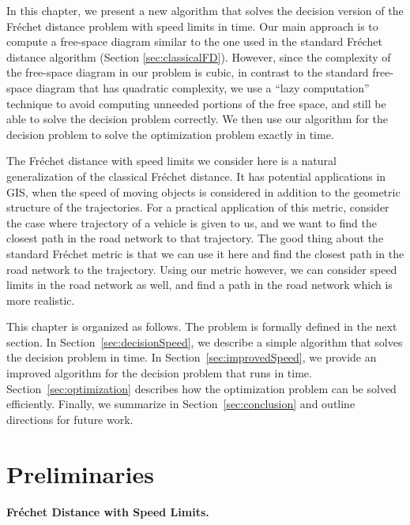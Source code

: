 \documentclass[12pt]{dalthesis}
\newcommand{\Frechet}{Fr\'echet }
\begin{document}
In this chapter, we present a new algorithm that solves the 
decision version of the \Frechet distance problem with speed limits in  time. 
Our main approach is to compute a free-space diagram 
similar to the one used in the standard \Frechet distance algorithm (Section \ref{sec:classicalFD}).
However, since the complexity of the free-space diagram  in our problem
is cubic, in contrast to the standard free-space diagram that has quadratic complexity,  
we use a ``lazy computation'' technique to
avoid computing unneeded portions of the free space, 
and still be able to solve the decision problem correctly.
We then use our algorithm for the decision problem to
solve the optimization problem exactly in  time.

The \Frechet distance with speed limits we consider here
is a natural generalization of the classical \Frechet distance.
It has potential applications in GIS, when the speed of moving objects is considered
in addition to the geometric structure of the trajectories.
For a practical application of this metric, 
consider the case where 
trajectory of a vehicle is given 
to us, and we want to find the closest path in the road network to that trajectory. The good thing about the standard \Frechet metric 
is that we can use it here and find the closest path in the road network to the trajectory. 
Using our metric however, we can consider speed limits in the road network as well, 
and find a path in the road network which is more realistic.

This chapter is organized as follows. 
The problem is formally defined in the next section.
In Section~\ref{sec:decisionSpeed}, we describe a simple algorithm that solves the decision problem in  time.
In Section~\ref{sec:improvedSpeed}, we provide an improved algorithm for the decision problem 
that runs in  time.
Section~\ref{sec:optimization} describes how the optimization problem can be solved efficiently.
Finally, we summarize in Section~\ref{sec:conclusion} and outline directions for future work.







\section{Preliminaries} \label{sec:preliminaries-Speed1}




\paragraph{\Frechet Distance with Speed Limits.}
\end{document}
